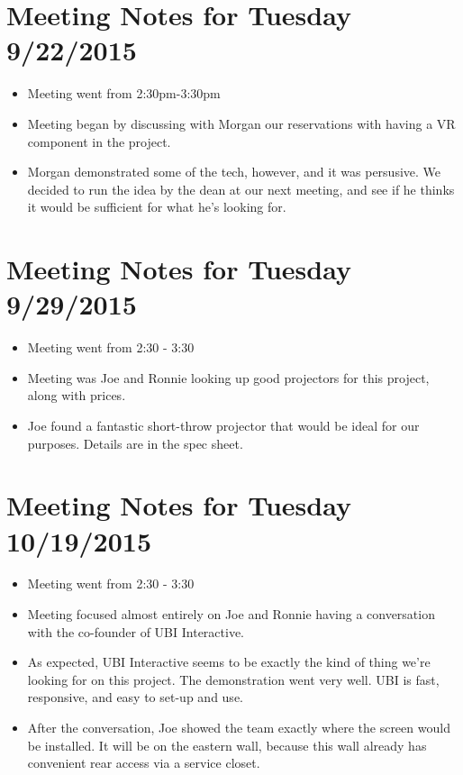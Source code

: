 \documentclass[]{article}
\begin{document}
\section{Meeting Notes for Tuesday 9/22/2015}
	\begin{itemize}
		\item Meeting went from 2:30pm-3:30pm
	\end{itemize}
	\begin{itemize}
		\item Meeting began by discussing with Morgan our reservations with having a VR component in the project. 
		\item Morgan demonstrated some of the tech, however, and it was persusive. We decided to run the idea by 
		the dean at our next meeting, and see if he thinks it would be sufficient for what he's looking for. 
	\end{itemize}
	
\section{Meeting Notes for Tuesday 9/29/2015}
\begin{itemize}
	\item Meeting went from 2:30 - 3:30
	\item Meeting was Joe and Ronnie looking up good projectors for this project, along with prices. 
	\item Joe found a fantastic short-throw projector that would be ideal for our purposes. Details are in the spec sheet. 
	
\end{itemize}

\section{Meeting Notes for Tuesday 10/19/2015}
\begin{itemize}
	\item Meeting went from 2:30 - 3:30
	\item Meeting focused almost entirely on Joe and Ronnie having a conversation with the co-founder of UBI Interactive. 	\item As expected, UBI Interactive seems to be exactly the kind of thing we're looking for on this project. The demonstration went very well. UBI is fast, responsive, and easy to set-up and use. 
	\item After the conversation, Joe showed the team exactly where the screen would be installed. It will be on the eastern wall, because this wall already has convenient rear access via a service closet. 
\end{itemize}
\end{document}
